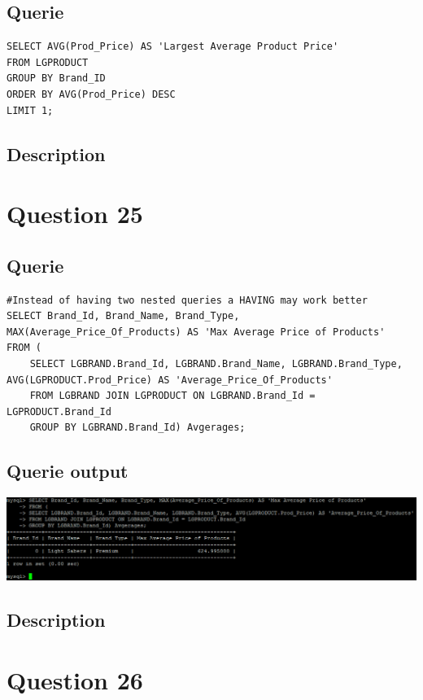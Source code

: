 \documentclass[a4paper,10pt]{article}
\begin{document}
 \subsection{Querie}
          \lstset{
            language=SQL,
            breaklines=true
            }
        \begin{lstlisting}[frame=single]
        SELECT AVG(Prod_Price) AS 'Largest Average Product Price'
FROM LGPRODUCT
GROUP BY Brand_ID
ORDER BY AVG(Prod_Price) DESC
LIMIT 1;
        \end{lstlisting}
\subsection{Description}\section*{Question 25}
 \subsection{Querie}
          \lstset{
            language=SQL,
            breaklines=true
            }
        \begin{lstlisting}[frame=single]
        #Instead of having two nested queries a HAVING may work better
SELECT Brand_Id, Brand_Name, Brand_Type, MAX(Average_Price_Of_Products) AS 'Max Average Price of Products'
FROM (
	SELECT LGBRAND.Brand_Id, LGBRAND.Brand_Name, LGBRAND.Brand_Type, AVG(LGPRODUCT.Prod_Price) AS 'Average_Price_Of_Products'
	FROM LGBRAND JOIN LGPRODUCT ON LGBRAND.Brand_Id = LGPRODUCT.Brand_Id
	GROUP BY LGBRAND.Brand_Id) Avgerages;

        \end{lstlisting}
\subsection{Querie output}
           \includegraphics{Queries/Question_25/Question_25_screenshot.PNG}
\subsection{Description}\section*{Question 26}
\end{document}
